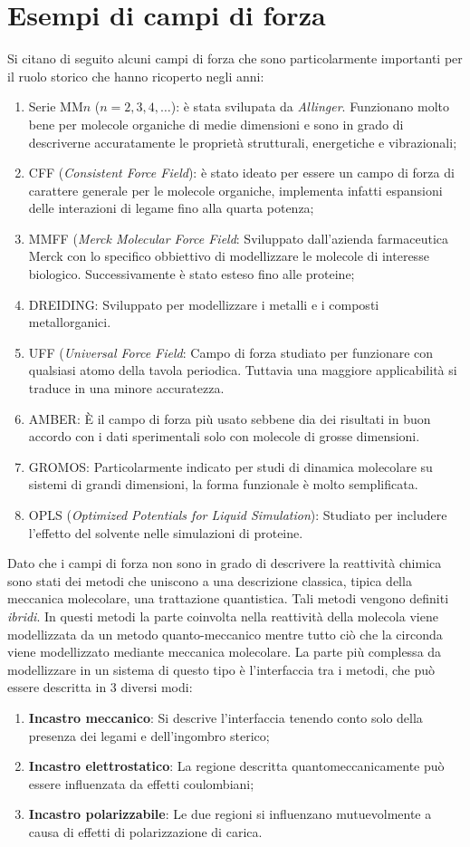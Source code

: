 \documentclass[oneside]{amsbook}
\numberwithin{section}{chapter}
\numberwithin{equation}{section}
\numberwithin{figure}{section}
\begin{document}
\section{Esempi di campi di forza}
Si citano di seguito alcuni campi di forza che sono particolarmente importanti per il ruolo storico che hanno ricoperto negli anni:
\begin{enumerate}
\item Serie MM$n$ ($n=2,3,4,\ldots$): è stata svilupata da \emph{Allinger}. Funzionano molto bene per molecole organiche di medie dimensioni e sono in grado di descriverne accuratamente le proprietà strutturali, energetiche e vibrazionali;
\item CFF (\emph{Consistent Force Field}): è stato ideato per essere un campo di forza di carattere generale per le molecole organiche,  implementa infatti     espansioni delle interazioni di legame fino alla quarta potenza;
\item MMFF (\emph{Merck Molecular Force Field}: Sviluppato dall'azienda farmaceutica Merck con lo specifico obbiettivo di modellizzare le molecole di interesse biologico. Successivamente è stato esteso fino alle proteine;
\item DREIDING: Sviluppato per modellizzare i metalli e i composti metallorganici.
\item UFF (\emph{Universal Force Field}: Campo di forza studiato per funzionare con qualsiasi atomo della tavola periodica. Tuttavia una maggiore applicabilità si traduce in una minore accuratezza.
\item AMBER: \`E il  campo di forza più usato sebbene dia dei risultati in buon accordo con i dati sperimentali solo con molecole di grosse dimensioni.
\item GROMOS: Particolarmente indicato per studi di dinamica molecolare su sistemi di grandi dimensioni, la forma funzionale è molto semplificata.
\item OPLS (\emph{Optimized Potentials for Liquid Simulation}): Studiato per includere l'effetto del solvente nelle simulazioni di proteine. 
\end{enumerate}
Dato che i campi di forza non sono in grado di descrivere la reattività chimica sono stati  dei metodi che uniscono a una descrizione classica, tipica della meccanica molecolare, una trattazione quantistica. Tali metodi vengono definiti \emph{ibridi}. In questi metodi la parte coinvolta nella reattività della molecola viene modellizzata da un metodo quanto-meccanico mentre tutto ciò che la circonda viene modellizzato mediante meccanica molecolare. La parte più complessa da modellizzare in un sistema di questo tipo è l'interfaccia tra i metodi, che può essere descritta in $ 3$ diversi modi:
\begin{enumerate}
\item \textbf{Incastro meccanico}: Si descrive l'interfaccia tenendo conto solo della presenza dei legami e dell'ingombro sterico;
\item \textbf{Incastro elettrostatico}: La regione descritta quantomeccanicamente può essere influenzata da effetti coulombiani;
\item \textbf{Incastro polarizzabile}: Le due regioni si influenzano mutuevolmente a causa di effetti di polarizzazione di carica.
\end{enumerate} 
\end{document}
